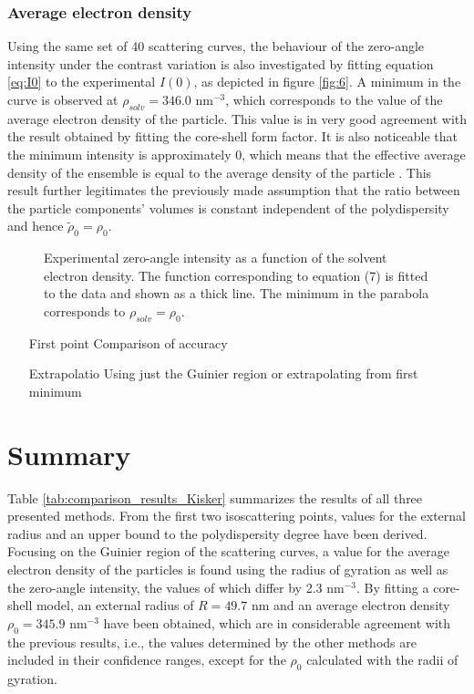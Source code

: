 \subsubsection{Average electron density}
Using the same set of 40 scattering curves, the behaviour of the zero-angle intensity under the contrast variation is also investigated by fitting equation \eqref{eq:I0} to the experimental \(I(0)\), as depicted in figure \ref{fig:6}. A minimum in the curve is observed at \(\rho_{solv}=346.0\) nm\(^{-3}\), which corresponds to the value of the average electron density of the particle. This value is in very good agreement with the result obtained by fitting the core-shell form factor. It is also noticeable that the minimum intensity is approximately 0, which means that the effective average density of the ensemble is equal to the average density of the particle \cite{Avdeev2007}. This result further legitimates the previously made assumption that the ratio between the particle components' volumes is constant independent of the polydispersity and hence \(  \tilde \rho_0 = \rho_0  \).

\begin{figure}%
	\centering
		
		\caption{Experimental zero-angle intensity as a function of the solvent electron density. The function corresponding to equation (7) is fitted to the data and shown as a thick line. The minimum in the parabola corresponds to $\rho_{solv}=\rho_0$.}
		\label{fig:KiskerIntensityParabola}
\end{figure}

\begin{itemize}
	\item [First point] Comparison of accuracy
	\item [Extrapolatio] Using just the Guinier region or extrapolating from first minimum
\end{itemize}

\section{Summary}
Table \ref{tab:comparison_results_Kisker} summarizes the results of all three presented methods. From the first two isoscattering points, values for the external radius and an upper bound to the polydispersity degree have been derived. Focusing on the Guinier region of the scattering curves, a value for the average electron density of the particles is found using the radius of gyration as well as the zero-angle intensity, the values of which differ by 2.3 nm\(^{-3}\). By fitting a core-shell model, an external radius of \(R=49.7\) nm and an average electron density \(\rho_0=345.9\) nm\(^{-3}\) have been obtained, which are in considerable agreement with the previous results, i.e., the values determined by the other methods are included in their confidence ranges, except for the \(\rho_0\) calculated with the radii of gyration.


